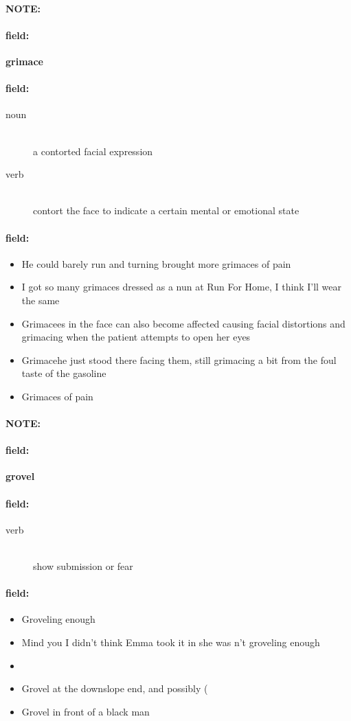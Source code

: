 \documentclass[12pt]{article}
\newenvironment{note}{\paragraph{NOTE:}}{}
\newenvironment{field}{\paragraph{field:}}{}
\begin{document}
\begin{note}
\begin{field}
\textbf{\large grimace}
\end{field}


\begin{field}
\begin{description}
\item[noun] \hfill \\ 
a contorted facial expression

\item[verb] \hfill \\ 
contort the face to indicate a certain mental or emotional state

\end{description}
\end{field}

\begin{field}
\begin{itemize}
\item He could barely run and turning brought more grimaces of pain
\item I got so many grimaces dressed as a nun at Run For Home, I think I'll wear the same
\item Grimacees in the face can also become affected causing facial distortions and grimacing when the patient attempts to open her eyes
\item Grimacehe just stood there facing them, still grimacing a bit from the foul taste of the gasoline
\item Grimaces of pain
\end{itemize}
\end{field}
\end{note}
\begin{note}
\begin{field}
\textbf{\large grovel}
\end{field}


\begin{field}
\begin{description}
\item[verb] \hfill \\ 
show submission or fear

\end{description}
\end{field}

\begin{field}
\begin{itemize}
\item Groveling enough
\item Mind you I didn't think Emma took it in she was n't groveling enough
\item 
\item Grovel at the downslope end, and possibly ( 
\item Grovel in front of a black man
\end{itemize}
\end{field}
\end{note}
\end{document}

